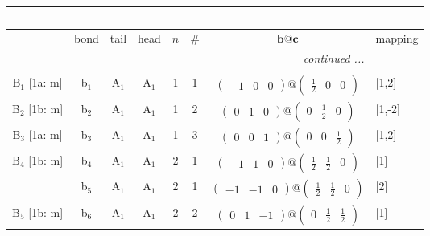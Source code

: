 \documentclass[fleqn,10pt,landscape]{article}
\begin{document}
\begin{itemize}
\begin{center}
\begin{longtable}{cc|cc|c|c|c|l}
\multicolumn{7}{l}{\tablename\ \thetable{}} \\
 \hline \hline
 & bond & tail & head & $n$ & \# & $\bm{b}@\bm{c}$ & mapping \\ \hline \endhead

 \hline \hline
\multicolumn{7}{r}{\footnotesize\it continued ...} \\ \endfoot

 \hline \hline
\multicolumn{7}{r}{} \\ \endlastfoot

B$_{1}$ [1a: m] & b$_{1}$ & A$_{1}$ & A$_{1}$ & 1 & 1 & $\begin{pmatrix} -1 & 0 & 0 \end{pmatrix}@\begin{pmatrix} \frac{1}{2} & 0 & 0 \end{pmatrix}$ & [1,2] \\ \hline
B$_{2}$ [1b: m] & b$_{2}$ & A$_{1}$ & A$_{1}$ & 1 & 2 & $\begin{pmatrix} 0 & 1 & 0 \end{pmatrix}@\begin{pmatrix} 0 & \frac{1}{2} & 0 \end{pmatrix}$ & [1,-2] \\ \hline
B$_{3}$ [1a: m] & b$_{3}$ & A$_{1}$ & A$_{1}$ & 1 & 3 & $\begin{pmatrix} 0 & 0 & 1 \end{pmatrix}@\begin{pmatrix} 0 & 0 & \frac{1}{2} \end{pmatrix}$ & [1,2] \\ \hline
B$_{4}$ [1b: m] & b$_{4}$ & A$_{1}$ & A$_{1}$ & 2 & 1 & $\begin{pmatrix} -1 & 1 & 0 \end{pmatrix}@\begin{pmatrix} \frac{1}{2} & \frac{1}{2} & 0 \end{pmatrix}$ & [1] \\
& b$_{5}$ & A$_{1}$ & A$_{1}$ & 2 & 1 & $\begin{pmatrix} -1 & -1 & 0 \end{pmatrix}@\begin{pmatrix} \frac{1}{2} & \frac{1}{2} & 0 \end{pmatrix}$ & [2] \\ \hline
B$_{5}$ [1b: m] & b$_{6}$ & A$_{1}$ & A$_{1}$ & 2 & 2 & $\begin{pmatrix} 0 & 1 & -1 \end{pmatrix}@\begin{pmatrix} 0 & \frac{1}{2} & \frac{1}{2} \end{pmatrix}$ & [1] \\

\end{longtable}
\end{center}
\end{itemize}
\end{document}
